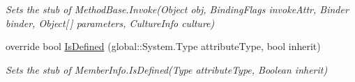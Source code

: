 \begin{DoxyCompactItemize}
\begin{DoxyCompactList}\small\item\em Sets the stub of Method\-Base.\-Invoke(\-Object obj, Binding\-Flags invoke\-Attr, Binder binder, Object\mbox{[}$\,$\mbox{]} parameters, Culture\-Info culture)\end{DoxyCompactList}\item 
override bool \hyperlink{class_system_1_1_reflection_1_1_fakes_1_1_stub_method_base_a9e48ddab7446b82e72cf76cf4f4c15dc}{Is\-Defined} (global\-::\-System.\-Type attribute\-Type, bool inherit)
\begin{DoxyCompactList}\small\item\em Sets the stub of Member\-Info.\-Is\-Defined(\-Type attribute\-Type, Boolean inherit)\end{DoxyCompactList}\end{DoxyCompactItemize}

